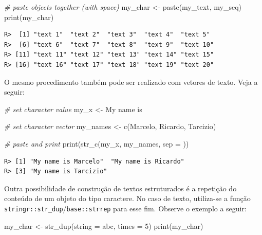 \documentclass[
  11pt,
]{book}
\newenvironment{Shaded}{\begin{snugshade}}{\end{snugshade}}
\newcommand{\AttributeTok}[1]{\textcolor[rgb]{0.61,0.61,0.61}{#1}}
\newcommand{\CommentTok}[1]{\textcolor[rgb]{0.37,0.37,0.37}{\textit{#1}}}
\newcommand{\DecValTok}[1]{\textcolor[rgb]{0.06,0.06,0.06}{#1}}
\newcommand{\FunctionTok}[1]{\textcolor[rgb]{0,0,0}{#1}}
\newcommand{\NormalTok}[1]{#1}
\newcommand{\OtherTok}[1]{\textcolor[rgb]{0.37,0.37,0.37}{#1}}
\newcommand{\StringTok}[1]{\textcolor[rgb]{0.5,0.5,0.5}{#1}}
\begin{document}
\begin{Shaded}
\begin{Highlighting}[]
\CommentTok{\# paste objects together (with space)}
\NormalTok{my\_char }\OtherTok{\textless{}{-}} \FunctionTok{paste}\NormalTok{(my\_text, my\_seq)}
\FunctionTok{print}\NormalTok{(my\_char)}
\end{Highlighting}
\end{Shaded}

\begin{verbatim}
R>  [1] "text 1"  "text 2"  "text 3"  "text 4"  "text 5" 
R>  [6] "text 6"  "text 7"  "text 8"  "text 9"  "text 10"
R> [11] "text 11" "text 12" "text 13" "text 14" "text 15"
R> [16] "text 16" "text 17" "text 18" "text 19" "text 20"
\end{verbatim}

O mesmo procedimento também pode ser realizado com vetores de texto. Veja a seguir:

\begin{Shaded}
\begin{Highlighting}[]
\CommentTok{\# set character value}
\NormalTok{my\_x }\OtherTok{\textless{}{-}} \StringTok{\textquotesingle{}My name is\textquotesingle{}}

\CommentTok{\# set character vector}
\NormalTok{my\_names }\OtherTok{\textless{}{-}} \FunctionTok{c}\NormalTok{(}\StringTok{\textquotesingle{}Marcelo\textquotesingle{}}\NormalTok{, }\StringTok{\textquotesingle{}Ricardo\textquotesingle{}}\NormalTok{, }\StringTok{\textquotesingle{}Tarcizio\textquotesingle{}}\NormalTok{)}

\CommentTok{\# paste and print}
\FunctionTok{print}\NormalTok{(}\FunctionTok{str\_c}\NormalTok{(my\_x, my\_names, }\AttributeTok{sep =} \StringTok{\textquotesingle{} \textquotesingle{}}\NormalTok{))}
\end{Highlighting}
\end{Shaded}

\begin{verbatim}
R> [1] "My name is Marcelo"  "My name is Ricardo" 
R> [3] "My name is Tarcizio"
\end{verbatim}

Outra possibilidade de construção de textos estruturados é a repetição do conteúdo de um objeto do tipo caractere. No caso de texto, utiliza-se a função \texttt{stringr::str\_dup}/\texttt{base::strrep} para esse fim. Observe o exemplo a seguir: 

\begin{Shaded}
\begin{Highlighting}[]
\NormalTok{my\_char }\OtherTok{\textless{}{-}} \FunctionTok{str\_dup}\NormalTok{(}\AttributeTok{string =} \StringTok{\textquotesingle{}abc\textquotesingle{}}\NormalTok{, }\AttributeTok{times =} \DecValTok{5}\NormalTok{)}
\FunctionTok{print}\NormalTok{(my\_char)}
\end{Highlighting}
\end{Shaded}
\end{document}
